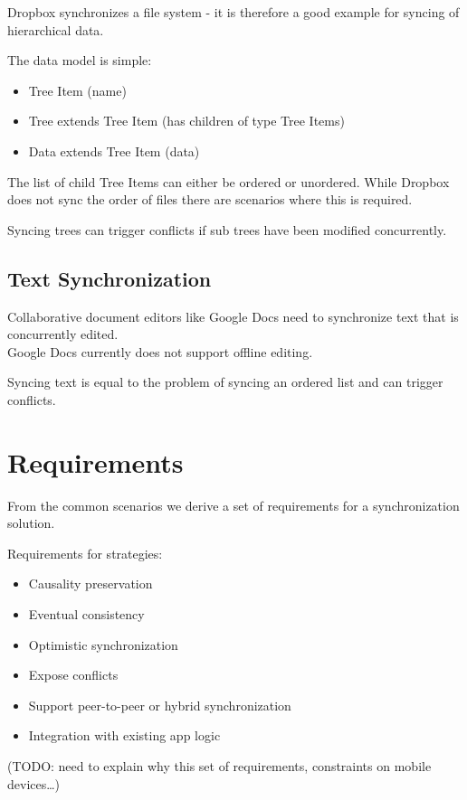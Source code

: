 Dropbox synchronizes a file system - it is therefore a good example for
syncing of hierarchical data.

The data model is simple:

\begin{itemize}
\item Tree Item (name)
\item Tree extends Tree Item (has children of type Tree Items)
\item Data extends Tree Item (data)
\end{itemize}

The list of child Tree Items can either be ordered or unordered. While
Dropbox does not sync the order of files there are scenarios where this
is required.

Syncing trees can trigger conflicts if sub trees have been modified
concurrently.

\subsection{Text Synchronization}

Collaborative document editors like Google Docs need to synchronize text
that is concurrently edited.\\Google Docs currently does not support
offline editing.

Syncing text is equal to the problem of syncing an ordered list and can
trigger conflicts.

\section{Requirements}
\label{sec:requirements}
From the common scenarios we derive a set of requirements for a synchronization solution.

Requirements for strategies:

\begin{itemize}
\item Causality preservation
\item Eventual consistency
\item Optimistic synchronization
\item Expose conflicts
\item Support peer-to-peer or hybrid synchronization
\item Integration with existing app logic
\end{itemize}

(TODO: need to explain why this set of requirements, constraints on
mobile devices\ldots{})

